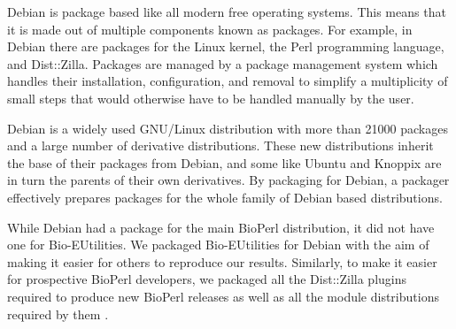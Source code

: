 Debian is package based like all modern free operating systems.
This means that it is made out of multiple components known as
packages.  For example, in Debian there are packages for the Linux
kernel, the Perl programming language, and Dist::Zilla.  Packages are
managed by a package management system which handles their
installation, configuration, and removal to simplify
a multiplicity of small steps that would otherwise
have to be handled manually by the user.


Debian is a widely used GNU/Linux
distribution with more than 21000 packages and a large
number of derivative distributions.  These new distributions
inherit the base of their packages from Debian, and some like Ubuntu
and Knoppix are in turn the parents of their own derivatives.  By packaging
for Debian, a packager effectively prepares packages for the whole family of
Debian based distributions.

While Debian had a package for the main BioPerl distribution, it did
not have one for Bio-EUtilities.  We packaged Bio-EUtilities for
Debian with the aim of making it easier for
others to reproduce our results.
Similarly, to make it easier for prospective BioPerl
developers, we packaged all the Dist::Zilla plugins required to produce
new BioPerl releases as well
as all the module distributions required by them
.

